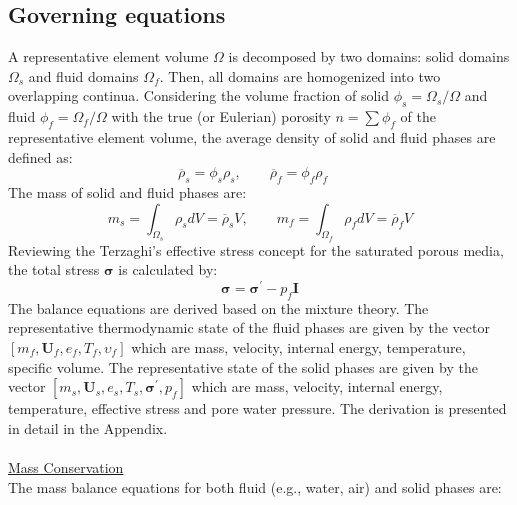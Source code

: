 \documentclass[preprint,12pt]{elsarticle}
\begin{document}
\subsection{\textsf{Governing equations}}
A representative element volume $\Omega$ is decomposed by two domains: solid domains $\Omega_s$ and fluid domains $\Omega_f$. Then, all domains are homogenized into two overlapping continua. Considering the volume fraction of solid $\phi_s = \Omega_s/\Omega$ and fluid $\phi_f = \Omega_f/\Omega$ with the true (or Eulerian) porosity $n=\sum{\phi_f}$ of the representative element volume, the average density of solid and fluid phases are defined as:\\
%
%
\begin{equation}
    \label{density} 
  \overline{\rho}_s   = \phi_s \rho_s, \qquad  \overline{\rho}_f   = \phi_f \rho_f \quad
\end {equation}
%
%
The mass of solid and fluid phases are:\\
%
%
\begin{equation}
    \label{mass} 
  m_s   = \int_{\Omega_s} \rho_s dV = \overline{\rho}_s V, \qquad  m_f   = \int_{\Omega_f} \rho_f dV = \overline{\rho}_f V
\end {equation}
%
%
Reviewing the Terzaghi's effective stress concept for the saturated porous media, the total stress $\pmb{\sigma}$ is calculated by:\\
%
%
\begin{equation}
    \label{Terzaghi} 
  \pmb{\sigma}   = \pmb{\sigma}^\prime -p_f\pmb{I}
\end {equation}
%
%
The balance equations are derived based on the mixture theory. The representative thermodynamic state of the fluid phases are given by the vector $[m_f,\pmb{U}_f,e_f,T_f,\upsilon_f]$ which are mass, velocity, internal energy, temperature, specific volume. The representative state of the solid phases are given by the vector $[m_s,\pmb{U}_s,e_s,T_s,\pmb{\sigma}^\prime,p_f]$ which are mass, velocity, internal energy, temperature, effective stress and pore water pressure. The derivation is presented in detail in the Appendix. \\
%
\underline{\hspace{5in}}\\
\underline{\textsf{Mass Conservation}}\\
The mass balance equations for both fluid (e.g., water, air) and solid phases are:\\
%
%
\end{document}
